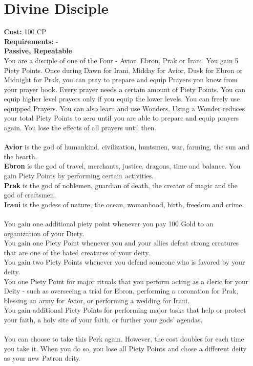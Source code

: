\section{Divine Disciple}
\textbf{Cost:} 100 CP\\
\textbf{Requirements:} - \\
\textbf{Passive, Repeatable}\\
You are a disciple of one of the Four - Avior, Ebron, Prak or Irani. You gain 5 Piety Points. Once during Dawn for Irani, Midday for Avior, Dusk for Ebron or Midnight for Prak, you can pray to prepare and equip Prayers you know from your prayer book. Every prayer needs a certain amount of Piety Points. You can equip higher level prayers only if you equip the lower levels. You can freely use equipped Prayers. You can also learn and use Wonders. Using a Wonder reduces your total Piety Points to zero until you are able to prepare and equip prayers again. You lose the effects of all prayers until then.\\
\\
\textbf{Avior} is the god of humankind, civilization, huntsmen, war, farming, the sun and the hearth.\\
\textbf{Ebron} is the god of travel, merchants, justice, dragons, time and balance. You gain Piety Points by performing certain activities.\\
\textbf{Prak} is the god of noblemen, guardian of death, the creator of magic and the god of craftsmen.\\
\textbf{Irani} is the godess of nature, the ocean, womanhood, birth, freedom and crime.\\
\\
You gain one additional piety point whenever you pay 100 Gold to an organization of your Diety.\\
You gain one Piety Point whenever you and your allies defeat strong creatures that are one of the hated creatures of your deity.\\
You gain two Piety Points whenever you defend someone who is favored by your deity.\\
You one Piety Point for major rituals that you perform acting as a cleric for your Deity - such as overseeing a trial for Ebron, performing a coronation for Prak, blessing an army for Avior, or performing a wedding for Irani.\\
You gain additional Piety Points for performing major tasks that help or protect your faith, a holy site of your faith, or further your gods' agendas.\\
\\
You can choose to take this Perk again. However, the cost doubles for each time you take it. When you do so, you lose all Piety Points and chose a different deity as your new Patron deity.